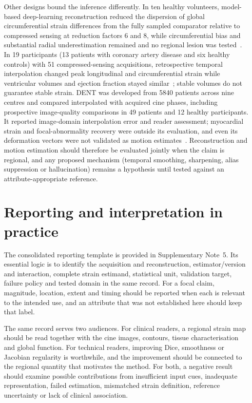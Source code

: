Other designs bound the inference differently. In ten healthy volunteers, model-based deep-learning reconstruction reduced the dispersion of global circumferential strain differences from the fully sampled comparator relative to compressed sensing at reduction factors 6 and 8, while circumferential bias and substantial radial underestimation remained and no regional lesion was tested~\cite{tsuneta2025dlr}. In 19 participants (13 patients with coronary artery disease and six healthy controls) with 51 compressed-sensing acquisitions, retrospective temporal interpolation changed peak longitudinal and circumferential strain while ventricular volumes and ejection fraction stayed similar~\cite{grob2025interp}; stable volumes do not guarantee stable strain. DENT was developed from 5840 patients across nine centres and compared interpolated with acquired cine phases, including prospective image-quality comparisons in 49 patients and 12 healthy participants. It reported image-domain interpolation error and reader assessment; myocardial strain and focal-abnormality recovery were outside its evaluation, and even its deformation vectors were not validated as motion estimates~\cite{morales2024dent}. Reconstruction and motion estimation should therefore be evaluated jointly when the claim is regional, and any proposed mechanism (temporal smoothing, sharpening, alias suppression or hallucination) remains a hypothesis until tested against an attribute-appropriate reference.

\section{Reporting and interpretation in practice}

The consolidated reporting template is provided in Supplementary Note~5. Its essential logic is to identify the acquisition and reconstruction, estimator/version and interaction, complete strain estimand, statistical unit, validation target, failure policy and tested domain in the same record. For a focal claim, magnitude, location, extent and timing should be reported when each is relevant to the intended use, and an attribute that was not established here should keep that label.

The same record serves two audiences. For clinical readers, a regional strain map should be read together with the cine images, contours, tissue characterisation and global function. For technical readers, improving Dice, smoothness or Jacobian regularity is worthwhile, and the improvement should be connected to the regional quantity that motivates the method. For both, a negative result should examine possible contributions from insufficient input cues, inadequate representation, failed estimation, mismatched strain definition, reference uncertainty or lack of clinical association.

